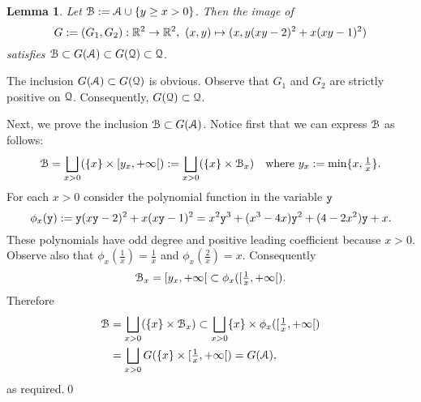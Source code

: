 \documentclass[1p]{elsarticle}
\newtheorem{lem}[thm]{Lemma}
\newcommand{\Qq}{{\EuScript Q}}
\newcommand{\Aa}{{\EuScript A}}
\newcommand{\Bb}{{\EuScript B}}
\begin{document}
\begin{lem}\label{step2}
Let $\Bb:=\Aa\cup\{y\geq x>0\}$. Then the image of 
$$
G:=(G_1,G_2):\R^2\to\R^2,\ (x,y)\mapsto(x,y(xy-2)^2+x(xy-1)^2)
$$ 
satisfies $\Bb\subset G(\Aa)\subset G(\Qq)\subset\Qq$. 
\end{lem}
\begin{pf}
The inclusion $G(\Aa)\subset G(\Qq)$ is obvious. Observe that $G_1$ and $G_2$ are strictly positive on $\Qq$. Consequently, $G(\Qq)\subset\Qq$.

Next, we prove the inclusion $\Bb\subset G(\Aa)$. Notice first that we can express $\Bb$ as follows:
$$
\Bb=\bigsqcup_{x>0}(\{x\}\times[y_x,+\infty[):=\bigsqcup_{x>0}(\{x\}\times\Bb_x)\quad\text{where $y_x:=\min\{x,\tfrac{1}{x}\}$.}
$$
For each $x>0$ consider the polynomial function in the variable ${\tt y}$
$$
\phi_x({\tt y}):={\tt y}(x{\tt y}-2)^2+x(x{\tt y}-1)^2=x^2{\tt y}^3+(x^3-4x){\tt y}^2+(4-2x^2){\tt y}+x.
$$
These polynomials have odd degree and positive leading coefficient because $x>0$. Observe also that $\phi_x(\tfrac{1}{x})=\tfrac{1}{x}$ and $\phi_x(\tfrac{2}{x})=x$. Consequently 
$$
\Bb_x={[y_x,+\infty[}\subset\phi_x([\tfrac{1}{x},+\infty[).
$$ 
Therefore
\begin{align*}
\Bb&=\bigsqcup_{x>0}(\{x\}\times\Bb_x)\subset\bigsqcup_{x>0}\{x\}\times
\phi_x({[\tfrac{1}{x},+\infty[})\\
&=\bigsqcup_{x>0}G(\{x\}\times{[\tfrac{1}{x},+\infty[})=G(\Aa),
\end{align*}
as required.\qed
\end{pf}
\end{document}
